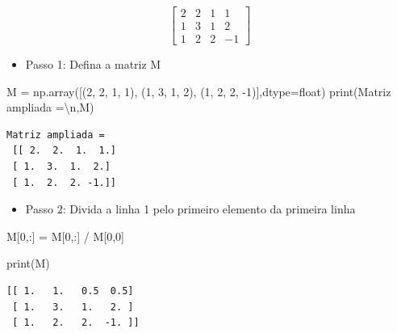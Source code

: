 \documentclass[
  brazilian,
  letterpaper,
  DIV=11,
  numbers=noendperiod]{scrreprt}
\newenvironment{Shaded}{\begin{snugshade}}{\end{snugshade}}
\newcommand{\BuiltInTok}[1]{\textcolor[rgb]{0.00,0.23,0.31}{#1}}
\newcommand{\CharTok}[1]{\textcolor[rgb]{0.13,0.47,0.30}{#1}}
\newcommand{\DecValTok}[1]{\textcolor[rgb]{0.68,0.00,0.00}{#1}}
\newcommand{\NormalTok}[1]{\textcolor[rgb]{0.00,0.23,0.31}{#1}}
\newcommand{\OperatorTok}[1]{\textcolor[rgb]{0.37,0.37,0.37}{#1}}
\newcommand{\StringTok}[1]{\textcolor[rgb]{0.13,0.47,0.30}{#1}}
\providecommand{\tightlist}{%
  \setlength{\itemsep}{0pt}\setlength{\parskip}{0pt}}
\begin{document}
\[\left[\begin{array}{ccc|c} 2 & 2 & 1 & 1 \\ 1 & 3 & 1 & 2 \\ 1 & 2 & 2 & -1 \end{array}\right] \]

\begin{itemize}
\tightlist
\item
  Passo 1: Defina a matriz M
\end{itemize}

\begin{Shaded}
\begin{Highlighting}[]
\NormalTok{M }\OperatorTok{=}\NormalTok{ np.array([(}\DecValTok{2}\NormalTok{, }\DecValTok{2}\NormalTok{, }\DecValTok{1}\NormalTok{, }\DecValTok{1}\NormalTok{),}
\NormalTok{              (}\DecValTok{1}\NormalTok{, }\DecValTok{3}\NormalTok{, }\DecValTok{1}\NormalTok{, }\DecValTok{2}\NormalTok{),}
\NormalTok{              (}\DecValTok{1}\NormalTok{, }\DecValTok{2}\NormalTok{, }\DecValTok{2}\NormalTok{, }\OperatorTok{{-}}\DecValTok{1}\NormalTok{)],dtype}\OperatorTok{=}\BuiltInTok{float}\NormalTok{)}
\BuiltInTok{print}\NormalTok{(}\StringTok{\textquotesingle{}Matriz ampliada =}\CharTok{\textbackslash{}n}\StringTok{\textquotesingle{}}\NormalTok{,M)}
\end{Highlighting}
\end{Shaded}

\begin{verbatim}
Matriz ampliada =
 [[ 2.  2.  1.  1.]
 [ 1.  3.  1.  2.]
 [ 1.  2.  2. -1.]]
\end{verbatim}

\begin{itemize}
\tightlist
\item
  Passo 2: Divida a linha 1 pelo primeiro elemento da primeira linha
\end{itemize}

\begin{Shaded}
\begin{Highlighting}[]
\NormalTok{M[}\DecValTok{0}\NormalTok{,:] }\OperatorTok{=}\NormalTok{ M[}\DecValTok{0}\NormalTok{,:] }\OperatorTok{/}\NormalTok{ M[}\DecValTok{0}\NormalTok{,}\DecValTok{0}\NormalTok{]}

\BuiltInTok{print}\NormalTok{(M)}
\end{Highlighting}
\end{Shaded}

\begin{verbatim}
[[ 1.   1.   0.5  0.5]
 [ 1.   3.   1.   2. ]
 [ 1.   2.   2.  -1. ]]
\end{verbatim}
\end{document}
